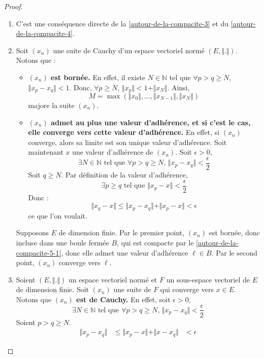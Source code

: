   \begin{proof}
    \begin{enumerate}[label=(\roman*)]
      \item C'est une conséquence directe de la \cref{autour-de-la-compacite-3} et du \cref{autour-de-la-compacite-4}.
      \item Soit $(x_n)$ une suite de Cauchy d'un espace vectoriel normé $(E, \Vert . \Vert)$. Notons que :
      \begin{itemize}
        \item \textbf{$(x_n)$ est bornée.} En effet, il existe $N \in \mathbb{N}$ tel que $\forall p > q \geq N$, $\Vert x_p - x_q \Vert < 1$. Donc, $\forall p \geq N$, $\Vert x_p \Vert < 1 + \Vert x_N \Vert$. Ainsi,
        \[ M = \max(\Vert x_0 \Vert, \dots, \Vert x_{N-1} \Vert, \Vert x_N \Vert) \]
        majore la suite $(x_n)$.
        \item \textbf{$(x_n)$ admet au plus une valeur d'adhérence, et si c'est le cas, elle converge vers cette valeur d'adhérence.} En effet, si $(x_n)$ converge, alors sa limite est son unique valeur d'adhérence. Soit maintenant $x$ une valeur d'adhérence de $(x_n)$. Soit $\epsilon > 0$,
        \[ \exists N \in \mathbb{N} \text{ tel que } \forall p > q \geq N, \, \Vert x_p - x_q \Vert < \frac{\epsilon}{2} \]
        Soit $q \geq N$. Par définition de la valeur d'adhérence,
        \[ \exists p \geq q \text{ tel que } \Vert x_p - x \Vert < \frac{\epsilon}{2} \]
        Donc :
        \[ \Vert x_q - x \Vert \leq \Vert x_p - x_q \Vert + \Vert x_p - x \Vert < \epsilon \]
        ce que l'on voulait.
      \end{itemize}
      Supposons $E$ de dimension finie. Par le premier point, $(x_n)$ est bornée, donc incluse dans une boule fermée $B$, qui est compacte par le \cref{autour-de-la-compacite-5-1}, donc elle admet une valeur d'adhérence $\ell \in B$. Par le second point, $(x_n)$ converge vers $\ell$.
      \item Soient $(E, \Vert . \Vert)$ un espace vectoriel normé et $F$ un sous-espace vectoriel de $E$ de dimension finie. Soit $(x_n)$ une suite de $F$ qui converge vers $x \in E$. Notons que \textbf{$(x_n)$ est de Cauchy.} En effet, soit $\epsilon > 0$,
      \[ \exists N \in \mathbb{N} \text{ tel que } \forall p > q \geq N, \, \Vert x_p - x_q \Vert < \frac{\epsilon}{2} \]
      Soient $p > q \geq N$.
      \begin{align*}
        \Vert x_p - x_q \Vert &\leq \Vert x_p - x \Vert + \Vert x - x_q \Vert
        &< \epsilon
      \end{align*}

\end{enumerate}
\end{proof}

